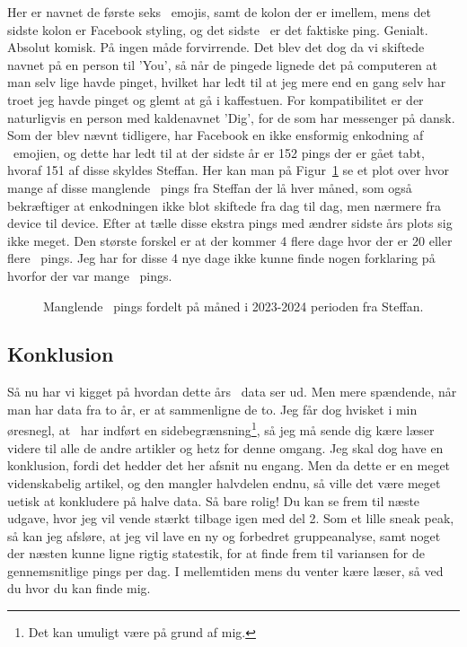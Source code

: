 \begin{article}
\vspace{4pt}
\noindent
Her er navnet de første seks \coffee\ emojis, samt de kolon der er imellem, mens det sidste kolon er Facebook styling, og det sidste \coffee\ er det faktiske ping. Genialt. Absolut komisk. På ingen måde forvirrende.
Det blev det dog da vi skiftede navnet på en person til 'You', så når de pingede lignede det på computeren at man selv lige havde pinget, hvilket har ledt til at jeg mere end en gang selv har troet jeg havde pinget og glemt at gå i kaffestuen. For kompatibilitet er der naturligvis en person med kaldenavnet 'Dig', for de som har messenger på dansk. \\

\noindent
Som der blev nævnt tidligere, har Facebook en ikke ensformig enkodning af \coffee\ emojien, og dette har ledt til at der sidste år er 152 pings der er gået tabt, hvoraf 151 af disse skyldes Steffan. Her kan man på Figur~\ref{fig:month_analysis_2022-2023_steffan_missing} se et plot over hvor mange af disse manglende \coffee\ pings fra Steffan der lå hver måned, som også bekræftiger at enkodningen ikke blot skiftede fra dag til dag, men nærmere fra device til device.
Efter at tælle disse ekstra pings med ændrer sidste års plots sig ikke meget. Den største forskel er at der kommer 4 flere dage hvor der er 20 eller flere \coffee\ pings. Jeg har for disse 4 nye dage ikke kunne finde nogen forklaring på hvorfor der var mange \coffee\ pings.

\begin{figure}[H]
	\centering
	\resizebox{\columnwidth}{!}{}
	\vspace{-20pt}
	\caption{Manglende \protect\coffee\ pings fordelt på måned i 2023-2024 perioden fra Steffan.}
	\label{fig:month_analysis_2022-2023_steffan_missing}
\end{figure}


\subsection*{Konklusion}

Så nu har vi kigget på hvordan dette års \coffee\ data ser ud. Men mere spændende, når man har data fra to år, er at sammenligne de to.
Jeg får dog hvisket i min øresnegl, at \madsfoek\ har indført en sidebegrænsning\footnote{Det kan umuligt være på grund af mig.}, så jeg må sende dig kære læser videre til alle de andre artikler og hetz for denne omgang.
Jeg skal dog have en konklusion, fordi det hedder det her afsnit nu engang. Men da dette er en meget videnskabelig artikel, og den mangler halvdelen endnu, så ville det være meget uetisk at konkludere på halve data. 
Så bare rolig! Du kan se frem til næste udgave, hvor jeg vil vende stærkt tilbage igen med del 2.
Som et lille sneak peak, så kan jeg afsløre, at jeg vil lave en ny og forbedret gruppeanalyse, samt noget der næsten kunne ligne rigtig statestik, for at finde frem til variansen for de gennemsnitlige pings per dag.
I mellemtiden mens du venter kære læser, så ved du hvor du kan finde mig. \coffee\


\end{article}
